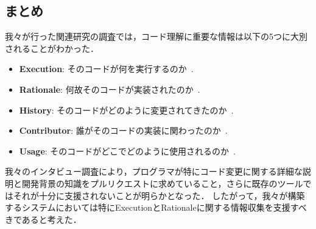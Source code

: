 
\subsection{まとめ}

我々が行った関連研究の調査では，コード理解に重要な情報は以下の5つに大別されることがわかった．



\begin{itemize}
\setlength{\itemsep}{0cm}
\item \textbf{Execution}: そのコードが何を実行するのか~\cite{Information_Needs_in_Collocated_Software_Development_Teams}.
\item \textbf{Rationale}: 何故そのコードが実装されたのか~\cite{Information_Needs_in_Collocated_Software_Development_Teams}.
\item \textbf{History}: そのコードがどのように変更されてきたのか~\cite{Chronicler}.
\item \textbf{Contributor}: 誰がそのコードの実装に関わったのか~\cite{Who_can_help_me_with_this_source_code_change}.
\item \textbf{Usage}: そのコードがどこでどのように使用されるのか~\cite{Six_Learning_Barriers_in_End_User_Programming_Systems}.
\end{itemize}


我々のインタビュー調査により，プログラマが特にコード変更に関する詳細な説明と開発背景の知識をプルリクエストに求めていること，さらに既存のツールではそれが十分に支援されないことが明らかとなった．
したがって，我々が構築するシステムにおいては特にExecutionとRationaleに関する情報収集を支援すべきであると考えた．









